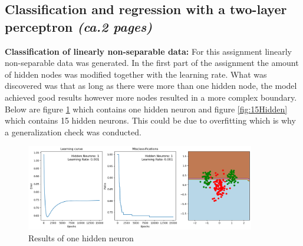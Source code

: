 \documentclass[a4paper]{article}
\begin{document}
\subsection{Classification and regression with a two-layer perceptron \textit{(ca.2 pages)}}
\textbf{Classification of linearly non-separable data:} For this assignment linearly non-separable data was generated. In the first part of the assignment the amount of hidden nodes was modified together with the learning rate. What was discovered was that as long as there were more than one hidden node, the model achieved good results however more nodes resulted in a more complex boundary. Below are figure \ref{fig:1Hidden} which contains one hidden neuron and figure \ref{fig:15Hidden} which contains 15 hidden neurons. This could be due to overfitting which is why a generalization check was conducted.

\begin{figure}[htb]
    \centering
    \includegraphics[width=10cm]{Labs/Lab 1/Lab 1b/Figure/1Hiddenlayer.png}
    \caption{Results of one hidden neuron}
    \label{fig:1Hidden}
\end{figure}
\end{document}
